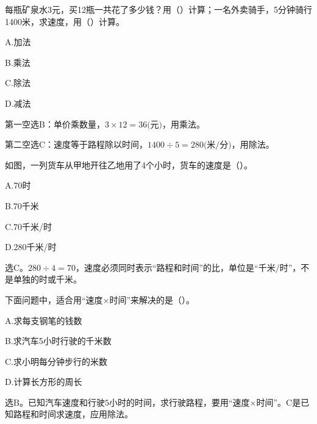 每瓶矿泉水3元，买12瓶一共花了多少钱？用（\hspace{1.8em}）计算；一名外卖骑手，5分钟骑行1400米，求速度，用（\hspace{1.8em}）计算。\par
\noindent A.加法\par
\noindent B.乘法\par
\noindent C.除法\par
\noindent D.减法\par
\begin{BookAnswer}
第一空选\(\mathrm B\)：单价乘数量，\allowbreak{}\(3\times12=36\text{(元)}\)，用乘法。\par 第二空选\(\mathrm C\)：速度等于路程除以时间，\allowbreak{}\(1400\div5=280\text{(米/分)}\)，用除法。
\end{BookAnswer}

如图，一列货车从甲地开往乙地用了4个小时，货车的速度是（\hspace{1.8em}）。\par
\noindent A.70时\par
\noindent B.70千米\par
\noindent C.70千米/时\par
\noindent D.280千米/时\par
{}
\begin{BookAnswer}
选\(\mathrm C\)。\(280\div4=70\)，速度必须同时表示“路程和时间”的比，单位是“千米/时”，不是单独的时或千米。
\end{BookAnswer}

下面问题中，适合用“速度\(\times\)时间”来解决的是（\hspace{1.8em}）。\par
\noindent A.求每支钢笔的钱数\par
\noindent B.求汽车5小时行驶的千米数\par
\noindent C.求小明每分钟步行的米数\par
\noindent D.计算长方形的周长\par
\begin{BookAnswer}
选\(\mathrm B\)。已知汽车速度和行驶\(5\)小时的时间，求行驶路程，要用“速度\(\times\)时间”。\(\mathrm C\)是已知路程和时间求速度，应用除法。
\end{BookAnswer}

